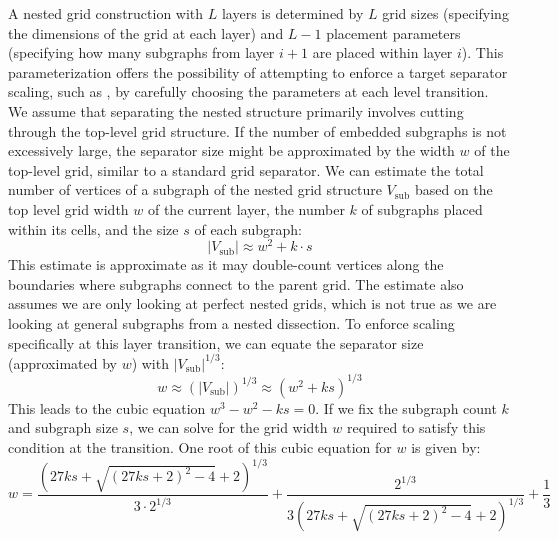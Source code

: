 A nested grid construction with \(L\) layers is determined by \(L\) grid sizes (specifying the dimensions of the grid at each layer) and \(L-1\) placement parameters (specifying how many subgraphs from layer \(i+1\) are placed within layer \(i\)).
This parameterization offers the possibility of attempting to enforce a target separator scaling, such as , by carefully choosing the parameters at each level transition.
We assume that separating the nested structure primarily involves cutting through the top-level grid structure.
If the number of embedded subgraphs is not excessively large, the separator size might be approximated by the width \(w\) of the top-level grid, similar to a standard grid separator.
We can estimate the total number of vertices of a subgraph of the nested grid structure \(V_\text{sub}\) based on the top level grid width \(w\) of the current layer, the number \(k\) of subgraphs placed within its cells, and the size \(s\) of each subgraph:
\[ |V_\text{sub}| \approx w^2 + k \cdot s \]
This estimate is approximate as it may double-count vertices along the boundaries where subgraphs connect to the parent grid.
The estimate also assumes we are only looking at perfect nested grids, which is not true as we are looking at general subgraphs from a nested dissection.
To enforce  scaling specifically at this layer transition, we can equate the separator size (approximated by \(w\)) with \(|V_\text{sub}|^{1/3}\):
\[ w \approx (|V_\text{sub}|)^{1/3} \approx (w^2 + ks)^{1/3} \]
This leads to the cubic equation \( w^3 - w^2 - ks = 0 \).
If we fix the subgraph count \(k\) and subgraph size \(s\), we can solve for the grid width \(w\) required to satisfy this condition at the transition.
One root of this cubic equation for \(w\) is given by:
\[ w = \frac{(27 k s + \sqrt{(27 k s + 2)^2 - 4} + 2)^{1/3}}{3 \cdot 2^{1/3}} + \frac{2^{1/3}}{3 (27 k s + \sqrt{(27 k s + 2)^2 - 4} + 2)^{1/3}} + \frac{1}{3} \]

